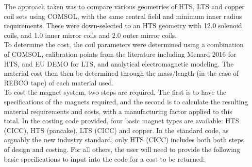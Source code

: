 The approach taken was to compare various geometries of HTS, LTS and copper coil sets using COMSOL, with the same central field and minimum inner radius requirements. These were down-selected to an HTS geometry with 12.0 solenoid coils, and 1.0 inner mirror coils and 2.0 outer mirror coils.\\

To determine the cost, the coil parameters were determined using a combination of COMSOL, calibration points from the literature including Menard 2016 \cite{Menard2016} for HTS, and EU DEMO for LTS, and analytical electromagnetic modeling. The material cost then then be determined through the mass/length (in the case of REBCO tape) of each material used. \\

To cost the magnet system, two steps are required. The first is to have the specifications of the magnets required, and the second is to calculate the resulting material requirements and costs, with a manufacturing factor applied to this total. In the costing code provided, four basic magnet types are available: HTS (CICC), HTS (pancake), LTS (CICC) and copper. In the standard code, as arguably the new industry standard, only HTS (CICC) includes both both steps of design and costing. For all others, the user will need to provide the following basic specifications to input into the code for a cost to be returned:

